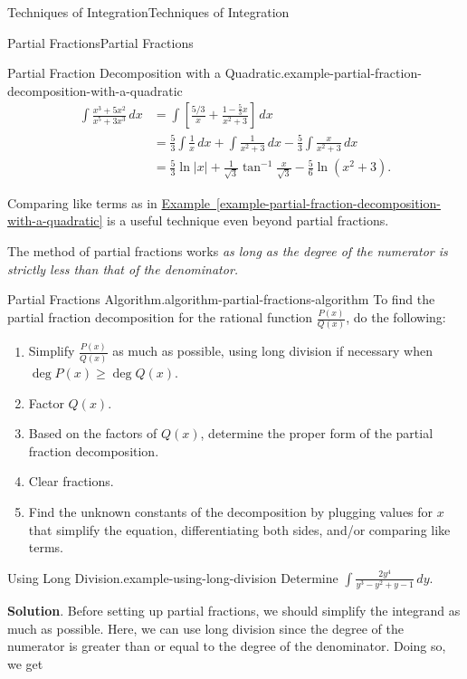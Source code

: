 \documentclass[10pt,]{book}
\numberwithin{equation}{section}
\begin{document}
\begin{chapterptx}{Techniques of Integration}{}{Techniques of Integration}{}{}
\begin{sectionptx}{Partial Fractions}{}{Partial Fractions}{}{}
\begin{example}{Partial Fraction Decomposition with a Quadratic.}{example-partial-fraction-decomposition-with-a-quadratic}
\begin{align*}
\int\frac{x^{3} + 5x^{2}}{x^{5} + 3x^{3}}\,dx & = \int\left[\frac{5/3}{x} + \frac{1 - \frac{5}{3}x}{x^{2} + 3}\right]\,dx \\
& = \frac{5}{3}\int\frac{1}{x}\,dx + \int\frac{1}{x^{2} + 3}\,dx - \frac{5}{3}\int\frac{x}{x^{2} + 3}\,dx \\
& = \frac{5}{3}\ln|x| + \frac{1}{\sqrt{3}}\tan^{-1}\frac{x}{\sqrt{3}} - \frac{5}{6}\ln(x^{2} + 3). 
\end{align*}
%
\end{example}
\hypertarget{p-564}{}%
Comparing like terms as in \hyperref[example-partial-fraction-decomposition-with-a-quadratic]{Example~\ref{example-partial-fraction-decomposition-with-a-quadratic}} is a useful technique even beyond partial fractions.%
\par
\hypertarget{p-565}{}%
The method of partial fractions works \emph{as long as the degree of the numerator is strictly less than that of the denominator.}%
\begin{algorithm}{Partial Fractions Algorithm.}{}{algorithm-partial-fractions-algorithm}%
\hypertarget{p-566}{}%
To find the partial fraction decomposition for the rational function \(\frac{P(x)}{Q(x)}\), do the following: \leavevmode%
\begin{enumerate}
\item\hypertarget{li-47}{}Simplify \(\frac{P(x)}{Q(x)}\) as much as possible, using long division if necessary when \(\deg P(x) \geq \deg Q(x)\).%
\item\hypertarget{li-48}{}Factor \(Q(x)\).%
\item\hypertarget{li-49}{}Based on the factors of \(Q(x)\), determine the proper form of the partial fraction decomposition.%
\item\hypertarget{li-50}{}Clear fractions.%
\item\hypertarget{li-51}{}Find the unknown constants of the decomposition by plugging values for \(x\) that simplify the equation, differentiating both sides, and/or comparing like terms.%
\end{enumerate}
%
\end{algorithm}
\begin{example}{Using Long Division.}{example-using-long-division}%
\hypertarget{p-567}{}%
Determine \(\int\frac{2y^{4}}{y^{3} - y^{2} + y - 1}\,dy\).%
\par\smallskip%
\noindent\textbf{Solution}.\hypertarget{solution-124}{}\quad%
\hypertarget{p-568}{}%
Before setting up partial fractions, we should simplify the integrand as much as possible. Here, we can use long division since the degree of the numerator is greater than or equal to the degree of the denominator. Doing so, we get%

\end{example}
\end{sectionptx}
\end{chapterptx}
\end{document}
